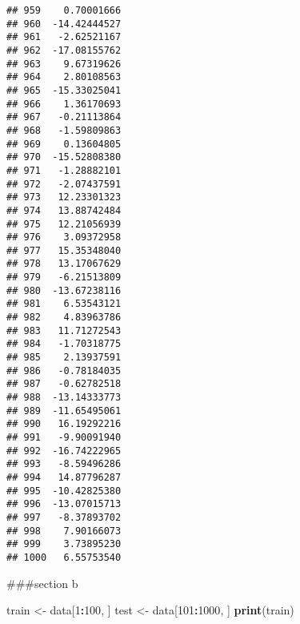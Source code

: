 \documentclass[
]{article}
\newenvironment{Shaded}{\begin{snugshade}}{\end{snugshade}}
\newcommand{\DecValTok}[1]{\textcolor[rgb]{0.00,0.00,0.81}{#1}}
\newcommand{\FunctionTok}[1]{\textcolor[rgb]{0.13,0.29,0.53}{\textbf{#1}}}
\newcommand{\NormalTok}[1]{#1}
\newcommand{\OtherTok}[1]{\textcolor[rgb]{0.56,0.35,0.01}{#1}}
\newcommand{\SpecialCharTok}[1]{\textcolor[rgb]{0.81,0.36,0.00}{\textbf{#1}}}
\begin{document}
\begin{verbatim}
## 959    0.70001666
## 960  -14.42444527
## 961   -2.62521167
## 962  -17.08155762
## 963    9.67319626
## 964    2.80108563
## 965  -15.33025041
## 966    1.36170693
## 967   -0.21113864
## 968   -1.59809863
## 969    0.13604805
## 970  -15.52808380
## 971   -1.28882101
## 972   -2.07437591
## 973   12.23301323
## 974   13.88742484
## 975   12.21056939
## 976    3.09372958
## 977   15.35348040
## 978   13.17067629
## 979   -6.21513809
## 980  -13.67238116
## 981    6.53543121
## 982    4.83963786
## 983   11.71272543
## 984   -1.70318775
## 985    2.13937591
## 986   -0.78184035
## 987   -0.62782518
## 988  -13.14333773
## 989  -11.65495061
## 990   16.19292216
## 991   -9.90091940
## 992  -16.74222965
## 993   -8.59496286
## 994   14.87796287
## 995  -10.42825380
## 996  -13.07015713
## 997   -8.37893702
## 998    7.90166073
## 999    3.73895230
## 1000   6.55753540
\end{verbatim}

\#\#\#section b

\begin{Shaded}
\begin{Highlighting}[]
\NormalTok{train }\OtherTok{\textless{}{-}}\NormalTok{ data[}\DecValTok{1}\SpecialCharTok{:}\DecValTok{100}\NormalTok{, ]}
\NormalTok{test }\OtherTok{\textless{}{-}}\NormalTok{ data[}\DecValTok{101}\SpecialCharTok{:}\DecValTok{1000}\NormalTok{, ]}
\FunctionTok{print}\NormalTok{(train)}
\end{Highlighting}
\end{Shaded}
\end{document}
